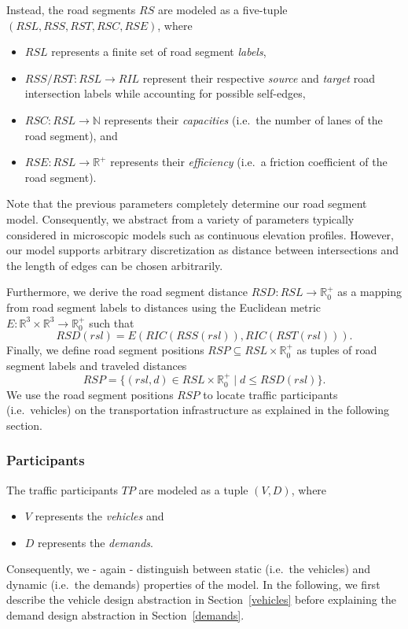 Instead, the road segments $RS$ are modeled as a five-tuple $(RSL, RSS, RST, RSC, RSE)$, where
\begin{itemize}
	\item $RSL$ represents a finite set of road segment \textit{labels},
	\item $RSS/RST: RSL \rightarrow RIL$ represent their respective \textit{source} and \textit{target} road intersection labels while accounting for possible self-edges,
	\item $RSC: RSL \rightarrow \mathbb{N}$ represents their \textit{capacities} (i.e.\ the number of lanes of the road segment), and
	\item $RSE: RSL \rightarrow \mathbb{R}^+$ represents their \textit{efficiency} (i.e.\ a friction coefficient of the road segment).
\end{itemize}
Note that the previous parameters completely determine our road segment model. Consequently, we abstract from a variety of parameters typically considered in microscopic models such as continuous elevation profiles. However, our model supports arbitrary discretization as distance between intersections and the length of edges can be chosen arbitrarily.


Furthermore, we derive the road segment distance $RSD: RSL \rightarrow \mathbb{R}_0^+$ as a mapping from road segment labels to distances using the Euclidean metric $E: \mathbb{R}^3 \times \mathbb{R}^3 \rightarrow \mathbb{R}_0^+$ such that
\[
	RSD(rsl) = E(RIC(RSS(rsl)), RIC(RST(rsl))) \textrm{.}
\]
Finally, we define road segment positions $RSP \subseteq RSL \times \mathbb{R}_0^+$ as tuples of road segment labels and traveled distances
\[
	RSP = \{(rsl, d) \in RSL \times \mathbb{R}_0^+ \mid d \leq RSD(rsl)\} \textrm{.}
\]
We use the road segment positions $RSP$ to locate traffic participants (i.e.\ vehicles) on the transportation infrastructure as explained in the following section. 

\subsubsection{Participants}
\label{participants}

The traffic participants $TP$ are modeled as a tuple $(V, D)$, where
\begin{itemize}
	\item $V$ represents the \textit{vehicles} and
	\item $D$ represents the \textit{demands}.
\end{itemize}
Consequently, we - again - distinguish between static (i.e.\ the vehicles) and dynamic (i.e.\ the demands) properties of the model. In the following, we first describe the vehicle design abstraction in Section~\ref{vehicles} before explaining the demand design abstraction in Section~\ref{demands}.

